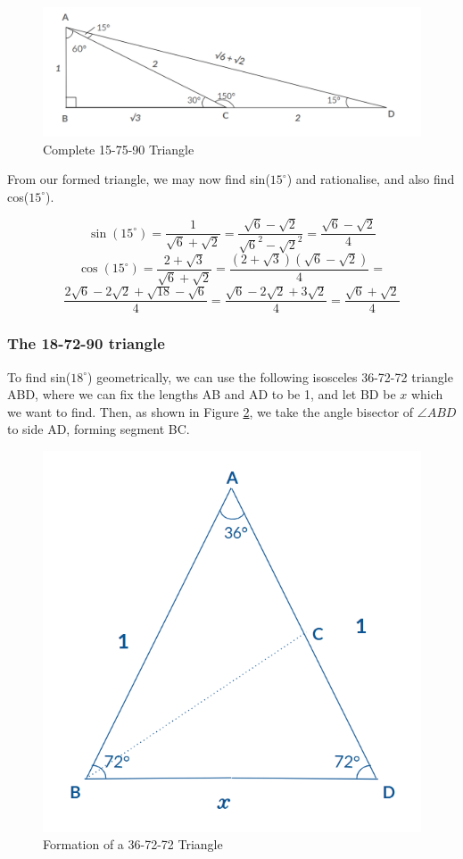 \documentclass[12pt]{article}
\begin{document}
\begin{figure}[h]
    \centering
    \includegraphics[width=0.8\linewidth]{15-75-90-complete.png}
    \caption{Complete 15-75-90 Triangle}
    \label{fig:15final}
\end{figure}

From our formed triangle, we may now find sin($15^{\circ}$) and rationalise, and also find cos($15^{\circ}$).

\[
    \sin(15^{\circ}) = \frac{1}{\sqrt{6}+\sqrt{2}} = \frac{\sqrt{6}-\sqrt{2}}{\sqrt{6}^2-\sqrt{2}^2}=\frac{\sqrt{6}-\sqrt{2}}{4}
\]
\[
    \cos(15^{\circ}) = \frac{2+\sqrt{3}}{\sqrt{6}+\sqrt{2}} = \frac{(2+\sqrt{3})(\sqrt{6}-\sqrt{2})}{4} = 
\]
\[
\frac{2\sqrt{6}-2\sqrt{2}+\sqrt{18}-\sqrt{6}}{4} =  \frac{\sqrt{6}-2\sqrt{2}+3\sqrt{2}}{4} = \frac{\sqrt{6}+\sqrt{2}}{4}
\]

\subsubsection{The 18-72-90 triangle}

To find sin($18^{\circ}$) geometrically, we can use the following isosceles 36-72-72 triangle ABD, where we can fix the lengths AB and AD to be 1, and let BD be $x$ which we want to find. Then, as shown in Figure \ref{fig:18tri1st}, we take the angle bisector of $\angle{ABD}$ to side AD, forming segment BC.

\begin{figure}[h]
    \centering
    \includegraphics[width=0.5\linewidth]{18tri1st.png}
    \caption{Formation of a 36-72-72 Triangle}
    \label{fig:18tri1st}
\end{figure}
\end{document}
